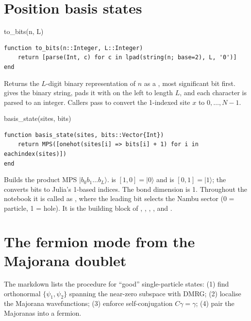 \documentclass[11pt]{article}
\newcommand{\ket}[1]{\lvert #1\rangle}
\begin{document}
\section{Position basis states}\label{sec:basis}

\begin{function}{to\_bits(n, L)}
\begin{Verbatim}
function to_bits(n::Integer, L::Integer)
    return [parse(Int, c) for c in lpad(string(n; base=2), L, '0')]
end
\end{Verbatim}
Returns the $L$-digit binary representation of $n$ as a , most significant bit first.
 gives the binary string,  pads it with  on the left to length $L$,
and each character is parsed to an integer. Callers pass  to convert the 1-indexed site $x$ to
$0,\dots,N-1$.
\end{function}

\begin{function}{basis\_state(sites, bits)}
\begin{Verbatim}
function basis_state(sites, bits::Vector{Int})
    return MPS([onehot(sites[i] => bits[i] + 1) for i in eachindex(sites)])
end
\end{Verbatim}
Builds the product MPS $\ket{b_0 b_1\dots b_L}$.  is $[1,0]=\ket{0}$ and
 is $[0,1]=\ket{1}$; the  converts bits to Julia's 1-based indices. The bond
dimension is 1. Throughout the notebook it is called as
, where the leading bit  selects the Nambu
sector (0 = particle, 1 = hole). It is the building block of , , ,
,  and .
\end{function}

\section{The fermion mode from the Majorana doublet}\label{sec:fermion}

The markdown lists the procedure for ``good'' single-particle states:
(1) find orthonormal $\{\psi_1,\psi_2\}$ spanning the near-zero subspace with DMRG;
(2) localise the Majorana wavefunctions;
(3) enforce self-conjugation $C\gamma=\gamma$;
(4) pair the Majoranas into a fermion.
\end{document}
